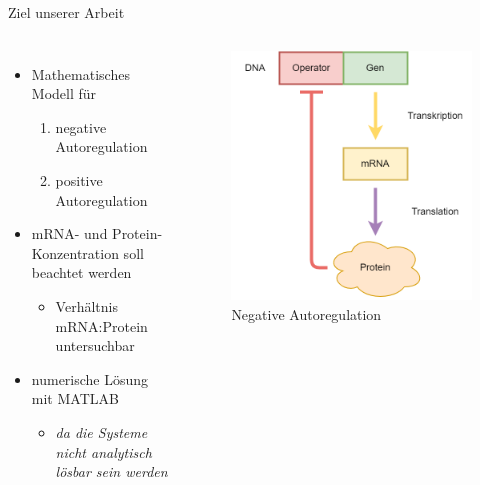 \documentclass[11pt,aspectratio=169,reqno]{beamer}
\begin{document}
\begin{frame}{Ziel unserer Arbeit}
\begin{columns}

    \begin{itemize}
        \item Mathematisches Modell für
        \begin{enumerate}
            \item negative Autoregulation
            \item positive Autoregulation
        \end{enumerate}
        \item mRNA- und Protein-Konzentration soll beachtet werden
        \begin{itemize}
            \item Verhältnis mRNA:Protein untersuchbar
        \end{itemize}
        \item numerische Lösung mit MATLAB
        \begin{itemize}
            \item \emph{da die Systeme nicht analytisch lösbar sein werden}
        \end{itemize}
    \end{itemize}
    
    \begin{figure}
        \centering
        \includegraphics[width=.7\textwidth]{images/repression.png}
        \caption{\tiny Negative Autoregulation}
    \end{figure}
\end{columns}
\end{frame}
\end{document}
